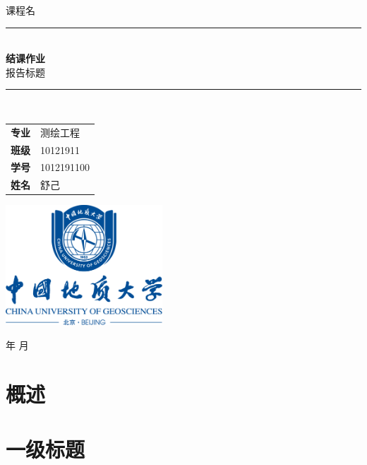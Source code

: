 \documentclass[12pt,a4paper,AutoFakeBold]{ctexart}
\begin{document}
\renewcommand{\today}{\number\year 年 \number\month 月}
\begin{titlepage}
    \clearpage\thispagestyle{empty}
    \centering
    \vspace{1cm}

    {\fangsong 课程名}
    \vspace{2.5cm}

    \rule{\linewidth}{2mm} \\[0.5cm]
    { \Huge \kaishu \textbf{结课作业}\\[0.2em]
    报告标题}\\[0.5cm]
    \rule{\linewidth}{0.6mm} \\[3.4cm]

    \hspace{2cm}
    \begin{tabular}{l p{5cm}}
        \textbf{专业} & 测绘工程   \\[18pt]
        \textbf{班级} & 10121911   \\[18pt]
        \textbf{学号} & 1012191100 \\[18pt]
        \textbf{姓名} & 舒己
    \end{tabular}

    \vspace{1.5cm}
    \centering \includegraphics[height=4.5cm]{校徽与中英文（蓝色中轴式）.png}\\ %
    \vspace{1.5cm}
    \begin{center}
        \today
    \end{center}
\end{titlepage}
\tableofcontents\thispagestyle{empty}
\newpage
\setcounter{page}{1}
\section{概述}

\section{一级标题}
\end{document}
